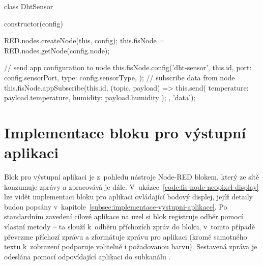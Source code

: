 \begin{code}[
    language=Javascript,
    label=code:fis-dht-app,
    caption={Detail implementace vstupní aplikace (z~hlediska centrálního uzlu) -- jedná se o~aplikaci pro
    senzory měřící teplotu a vlhkost okolí.
    Konstruktor této třídy je zodpovědný za konfiguraci aplikace na uzlu za pomoci metody \ic{config} a následnou
    registraci odběru zprávy z~uzlu -- funkce volaná na příchozí zprávy z~nich přejímá data a zasílá je dále do sítě
    nástroje Node-RED (volání \ic{this.send})}.
]
class DhtSensor {
    constructor(config) {
        RED.nodes.createNode(this, config);
        this.fisNode = RED.nodes.getNode(config.node);

        // send app configuration to node
        this.fisNode.config('dht-sensor', this.id, {
            port: config.sensorPort,
            type: config.sensorType,
        });
        // subscribe data from node
        this.fisNode.appSubscribe(this.id, (topic, payload) => {
            this.send({
                temperature: payload.temperature,
                humidity: payload.humidity
            });
        }, 'data');
    }
}
\end{code}

\section{Implementace bloku pro výstupní aplikaci}\label{sec:implementace-bloku-pro-vystupni-aplikace}
Blok pro výstupní aplikaci je z~pohledu nástroje Node-RED blokem, který ze sítě konzumuje zprávy a zpracovává je dále.
V~ukázce~\ref{code:fis-node-neopixel-display} lze vidět implementaci bloku pro aplikaci ovládající bodový displej,
jejíž detaily budou popsány v~kapitole~\ref{subsec:implementace-vystupni-aplikace}.
Po standardním zavedení cílové aplikace na uzel si blok registruje odběr pomocí vlastní metody  -- ta slouží
k~odběru příchozích zpráv do bloku, v~tomto případě převezme příchozí zprávu a zformátuje zprávu pro aplikaci
(kromě samotného textu k~zobrazení podporuje volitelně i požadovanou barvu).
Sestavená zpráva je odeslána pomocí  odpovídající aplikaci do subkanálu .

